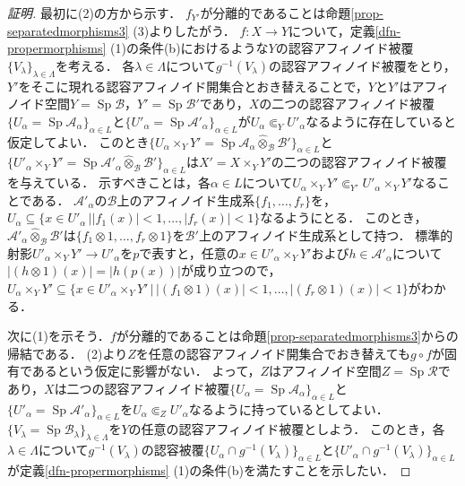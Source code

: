 \documentclass[a4paper,12pt, dvipdfmx]{jsbook}
\def\Sp{\mathop{\mathrm{Sp}}\nolimits}
\newcommand{\abs}[1]{\lvert#1\rvert}
\theoremstyle{plain}
\theoremstyle{definition}
\begin{document}
\begin{proof}[証明]
最初に(2)の方から示す．
$f_{Y'}$が分離的であることは命題\ref{prop-separatedmorphisms3} (3)よりしたがう．
$f\colon X\rightarrow Y$について，定義\ref{dfn-propermorphisms} (1)の条件(b)におけるような$Y$の認容アフィノイド被覆$\{V_{\lambda}\}_{\lambda\in\Lambda}$を考える．
各$\lambda\in\Lambda$について$g^{-1}(V_{\lambda})$の認容アフィノイド被覆をとり，$Y'$をそこに現れる認容アフィノイド開集合とおき替えることで，$Y$と$Y'$はアフィノイド空間$Y=\Sp\mathcal{B}$，$Y'=\Sp\mathcal{B}'$であり，$X$の二つの認容アフィノイド被覆$\{U_{\alpha}=\Sp\mathcal{A}_{\alpha}\}_{\alpha\in L}$と$\{U'_{\alpha}=\Sp\mathcal{A}'_{\alpha}\}_{\alpha\in L}$が$U_{\alpha}\Subset_YU'_{\alpha}$なるように存在していると仮定してよい．
このとき$\{U_{\alpha}\times_YY'=\Sp\mathcal{A}_{\alpha}\widehat{\otimes}_{\mathcal{B}}\mathcal{B}'\}_{\alpha\in L}$と$\{U'_{\alpha}\times_YY'=\Sp\mathcal{A}'_{\alpha}\widehat{\otimes}_{\mathcal{B}}\mathcal{B}'\}_{\alpha\in L}$は$X'=X\times_YY'$の二つの認容アフィノイド被覆を与えている．
示すべきことは，各$\alpha\in L$について$U_{\alpha}\times_YY'\Subset_{Y'}U'_{\alpha}\times_YY'$なることである．
$\mathcal{A}'_{\alpha}$の$\mathcal{B}$上のアフィノイド生成系$\{f_1,\ldots,f_r\}$を，$U_{\alpha}\subseteq\{x\in U'_{\alpha}\,|\abs{f_1(x)}<1,\ldots,\abs{f_r(x)}<1\}$なるようにとる．
このとき，$\mathcal{A}'_{\alpha}\widehat{\otimes}_{\mathcal{B}}\mathcal{B}'$は$\{f_1\otimes 1,\ldots,f_r\otimes 1\}$を$\mathcal{B}'$上のアフィノイド生成系として持つ．
標準的射影$U'_{\alpha}\times_YY'\rightarrow U'_{\alpha}$を$p$で表すと，任意の$x\in U'_{\alpha}\times_YY'$および$h\in\mathcal{A}'_{\alpha}$について$\abs{(h\otimes 1)(x)}=\abs{h(p(x))}$が成り立つので，$U_{\alpha}\times_YY'\subseteq\{x\in U'_{\alpha}\times_YY'\,|\,\abs{(f_1\otimes 1)(x)}<1,\ldots,\abs{(f_r\otimes 1)(x)}<1\}$がわかる．

次に(1)を示そう．$f$が分離的であることは命題\ref{prop-separatedmorphisms3}からの帰結である．
(2)より$Z$を任意の認容アフィノイド開集合でおき替えても$g\circ f$が固有であるという仮定に影響がない．
よって，$Z$はアフィノイド空間$Z=\Sp\mathcal{R}$であり，$X$は二つの認容アフィノイド被覆$\{U_{\alpha}=\Sp\mathcal{A}_{\alpha}\}_{\alpha\in L}$と$\{U'_{\alpha}=\Sp\mathcal{A}'_{\alpha}\}_{\alpha\in L}$を$U_{\alpha}\Subset_ZU'_{\alpha}$なるように持っているとしてよい．
$\{V_{\lambda}=\Sp\mathcal{B}_{\lambda}\}_{\lambda\in\Lambda}$を$Y$の任意の認容アフィノイド被覆としよう．
このとき，各$\lambda\in\Lambda$について$g^{-1}(V_{\lambda})$の認容被覆$\{U_{\alpha}\cap g^{-1}(V_{\lambda})\}_{\alpha\in L}$と$\{U'_{\alpha}\cap g^{-1}(V_{\lambda})\}_{\alpha\in L}$が定義\ref{dfn-propermorphisms} (1)の条件(b)を満たすことを示したい．


\end{proof}
\end{document}
